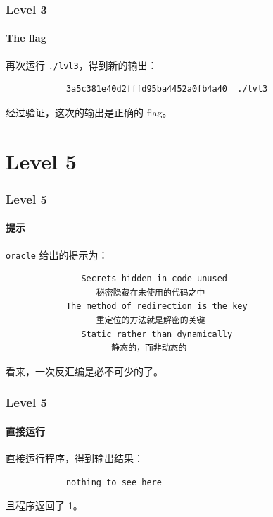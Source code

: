 \documentclass{ctexbeamer}
\begin{document}
    \begin{frame}[fragile]
        \frametitle{Level 3}
        \framesubtitle{The flag}
    
        再次运行 \texttt{./lvl3}，得到新的输出：

        \begin{verbatim}
            3a5c381e40d2fffd95ba4452a0fb4a40  ./lvl3
        \end{verbatim}

        经过验证，这次的输出是正确的 flag。
    
    \end{frame}

    \section{Level 5}

    \begin{frame}[fragile]
        \frametitle{Level 5}
        \framesubtitle{提示}
    
        \texttt{oracle} 给出的提示为：

        \begin{verbatim}
               Secrets hidden in code unused
                  秘密隐藏在未使用的代码之中
            The method of redirection is the key
                  重定位的方法就是解密的关键
               Static rather than dynamically
                     静态的，而非动态的
        \end{verbatim}

        看来，一次反汇编是必不可少的了。
    
    \end{frame}

    \begin{frame}[fragile]
        \frametitle{Level 5}
        \framesubtitle{直接运行}
    
        直接运行程序，得到输出结果：

        \begin{verbatim}
            nothing to see here
        \end{verbatim}

        且程序返回了 1。
    
    \end{frame}
\end{document}
